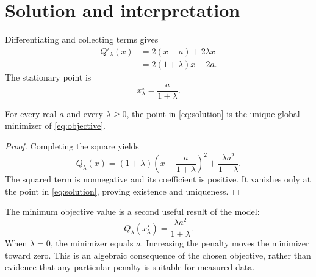 \section{Solution and interpretation}
Differentiating and collecting terms gives
\begin{align*}
Q'_\lambda(x)&=2(x-a)+2\lambda x\\
             &=2(1+\lambda)x-2a.
\end{align*}
The stationary point is
\begin{equation}\label{eq:solution}
x_\lambda^\star=\frac{a}{1+\lambda}.
\end{equation}
\begin{paperlemma}\label{lem:minimum}
For every real $a$ and every $\lambda\geq 0$, the point in
\eqref{eq:solution} is the unique global minimizer of
\eqref{eq:objective}.
\end{paperlemma}
\begin{proof}
Completing the square yields
\[
Q_\lambda(x)=(1+\lambda)
 \left(x-\frac{a}{1+\lambda}\right)^2+
 \frac{\lambda a^2}{1+\lambda}.
\]
The squared term is nonnegative and its coefficient is positive. It vanishes
only at the point in \eqref{eq:solution}, proving existence and uniqueness.
\end{proof}
The minimum objective value is a second useful result of the model:
\begin{equation}\label{eq:minimum-value}
Q_\lambda(x_\lambda^\star)=\frac{\lambda a^2}{1+\lambda}.
\end{equation}
When $\lambda=0$, the minimizer equals $a$. Increasing the penalty moves the
minimizer toward zero. This is an algebraic consequence of the chosen objective,
rather than evidence that any particular penalty is suitable for measured data.
